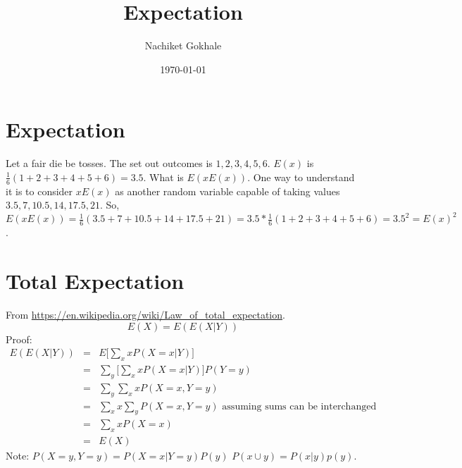 \documentclass{article}
\newcommand{\beq}{\begin{equation}}
\newcommand{\eeq}{\end{equation}}
\newcommand{\ber}{\begin{eqnarray}}
\newcommand{\eer}{\end{eqnarray}}
\begin{document}
\title{Expectation}
\author{Nachiket Gokhale}
\date{\today}
\maketitle
\section{Expectation}
Let a fair die be tosses. The set out outcomes is ${1,2,3,4,5,6}$. $E(x)$ is $\frac{1}{6}(1+2+3+4+5+6)=3.5$. What is $E(xE(x))$. One way to understand it is to consider $xE(x)$ as another random variable capable of taking values ${3.5,7,10.5,14,17.5,21}$. So, $E(xE(x))=\frac{1}{6}(3.5+7+10.5+14+17.5+21)=3.5*\frac{1}{6}(1+2+3+4+5+6)=3.5^2=E(x)^2$.
\section{Total Expectation}
From \url{https://en.wikipedia.org/wiki/Law_of_total_expectation}.
\beq
E(X) = E(E(X|Y))
\eeq
Proof:
\ber
E(E(X|Y)) &=& E\Big[\sum_{x}xP(X=x|Y)\Big] \\
&=& \sum_y\Big[\sum_{x}xP(X=x|Y)\Big]P(Y=y) \\
&=& \sum_y\sum_xxP(X=x,Y=y) \\
&=& \sum_x x \sum_yP(X=x,Y=y) \text{ assuming sums can be interchanged } \\
&=& \sum_x x P(X=x) \\
&=& E(X)
\eer
Note: $P(X=y,Y=y)=P(X=x|Y=y)P(y)$  $P(x\cup{y}) = P(x|y)p(y)$.
\end{document}

